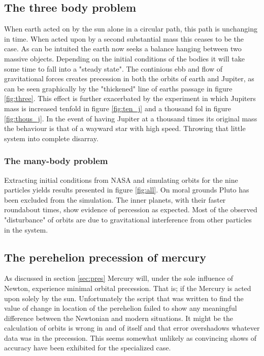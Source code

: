 \subsection{The three body problem}
When earth acted on by the sun alone in a circular path, this path is unchanging in time. When acted upon by a second substantial mass this ceases to be the case. As can be intuited the earth now seeks a balance hanging between two massive objects. Depending on the initial conditions of the bodies it will take some time to fall into a "steady state". The continious ebb and flow of gravitational forces creates precession in both the orbits of earth and Jupiter, as can be seen graphically by the "thickened" line of earths passage in figure \ref{fig:three}. This effect is further exacerbated by  the experiment in which Jupiters mass is increased tenfold in figure \ref{fig:ten_j} and a thousand fol in figure \ref{fig:thous_j}.
In the event of having Jupiter at a thousand times its original mass the behaviour is that of a wayward star with high speed. Throwing that little system into complete disarray.   


\subsubsection{The many-body problem}
Extracting initial conditions from NASA and simulating orbits for the  nine particles yields results presented in figure \ref{fig:all}. On moral grounds Pluto has been excluded from the simulation. The inner planets, with their faster roundabout  times, show evidence of percession as expected. Most of the observed "disturbance" of  orbits are due to gravitational interference from other particles  in the system.  

\subsection{The perehelion precession of mercury}
As discussed in section \ref{sec:pres} Mercury will, under the sole influence of Newton, experience minimal orbital precession. That is; if the Mercury is acted upon solely by the sun. Unfortunately the script that was written to find the value of change in location of the perehelion failed to show any meaningful difference between the Newtonian and modern situations. It might be the calculation of orbits is wrong in and of itself and that error overshadows whatever data was in the precession. This seems somewhat unlikely as convincing shows of accuracy have been exhibited for the specialized case.  


